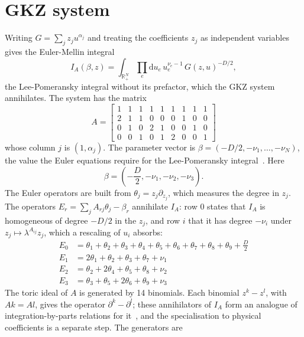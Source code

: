 \documentclass[11pt,a4paper]{article}
\begin{document}
\section{GKZ system}
\label{sec:gkz-system}
Writing $G = \sum_j z_j u^{\alpha_j}$ and treating the coefficients $z_j$ as independent variables gives the Euler-Mellin integral
\begin{equation*}
I_A(\beta, z) = \int_{\mathbb{R}_{+}^{N}} \prod_{e} \mathrm{d}u_e\, u_e^{\nu_e - 1}\, G(z, u)^{-D/2},
\end{equation*}
the Lee-Pomeransky integral without its prefactor, which the GKZ system annihilates. The system has the matrix
\begin{equation*}
A = \begin{bmatrix}
1 & 1 & 1 & 1 & 1 & 1 & 1 & 1 & 1 \\
2 & 1 & 1 & 0 & 0 & 0 & 1 & 0 & 0 \\
0 & 1 & 0 & 2 & 1 & 0 & 0 & 1 & 0 \\
0 & 0 & 1 & 0 & 1 & 2 & 0 & 0 & 1
\end{bmatrix}
\end{equation*}
whose column $j$ is $(1, \alpha_j)$. The parameter vector is $\beta = (-D/2, -\nu_1, \ldots, -\nu_N)$, the value the Euler equations require for the Lee-Pomeransky integral~\cite{delacruz2019,klausen2020}. Here
\begin{equation*}
\beta = \left(- \frac{D}{2}, - \nu_{1}, - \nu_{2}, - \nu_{3}\right).
\end{equation*}
The Euler operators are built from $\theta_j = z_j \partial_{z_j}$, which measures the degree in $z_j$. The operators $E_r = \sum_j A_{rj}\theta_j - \beta_r$ annihilate $I_A$: row $0$ states that $I_A$ is homogeneous of degree $-D/2$ in the $z_j$, and row $i$ that it has degree $-\nu_i$ under $z_j \mapsto \lambda^{A_{ij}} z_j$, which a rescaling of $u_i$ absorbs:
\begin{align*}
E_{0} &= \theta_{1} + \theta_{2} + \theta_{3} + \theta_{4} + \theta_{5} + \theta_{6} + \theta_{7} + \theta_{8} + \theta_{9} + \frac{D}{2} \\
E_{1} &= 2 \theta_{1} + \theta_{2} + \theta_{3} + \theta_{7} + \nu_{1} \\
E_{2} &= \theta_{2} + 2 \theta_{4} + \theta_{5} + \theta_{8} + \nu_{2} \\
E_{3} &= \theta_{3} + \theta_{5} + 2 \theta_{6} + \theta_{9} + \nu_{3}
\end{align*}
The toric ideal of $A$ is generated by 14 binomials. Each binomial $z^{k} - z^{l}$, with $Ak = Al$, gives the operator $\partial^{k} - \partial^{l}$; these annihilators of $I_A$ form an analogue of integration-by-parts relations for it~\cite{chestnov2022}, and the specialisation to physical coefficients is a separate step. The generators are
\end{document}
